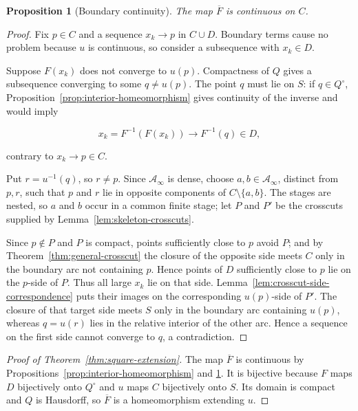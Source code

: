 \documentclass[11pt]{article}
\theoremstyle{mainplain}
\newtheorem{proposition}[theorem]{Proposition}
\theoremstyle{mainroman}
\theoremstyle{definition}
\numberwithin{equation}{section}
\begin{document}
\begin{proposition}[Boundary continuity]\label{prop:boundary-continuity}
The map \(\overline F\) is continuous on \(C\).
\end{proposition}
\begin{proof}
Fix \(p\in C\) and a sequence \(x_k\to p\) in \(C\cup D\). Boundary terms cause no problem because \(u\) is continuous, so consider a subsequence with \(x_k\in D\).

Suppose \(F(x_k)\) does not converge to \(u(p)\). Compactness of \(Q\) gives a subsequence converging to some \(q\ne u(p)\). The point \(q\) must lie on \(S\): if \(q\in Q^\circ\),
Proposition~\ref{prop:interior-homeomorphism} gives continuity of the inverse and
would imply

\[
x_k=F^{-1}(F(x_k))\longrightarrow F^{-1}(q)\in D,
\]

contrary to \(x_k\to p\in C\).

Put \(r=u^{-1}(q)\), so \(r\ne p\). Since \(\mathcal A_\infty\) is dense, choose \(a,b\in\mathcal A_\infty\), distinct from \(p,r\), such that \(p\) and \(r\) lie in opposite components of \(C\setminus\{a,b\}\). The stages are nested, so \(a\) and \(b\) occur in a common finite stage; let \(P\) and \(P'\) be the crosscuts supplied by Lemma~\ref{lem:skeleton-crosscuts}.

Since \(p\notin P\) and \(P\) is compact, points sufficiently close to \(p\) avoid \(P\); and by Theorem~\ref{thm:general-crosscut} the closure of the opposite side meets \(C\) only in the boundary arc not containing \(p\). Hence points of \(D\) sufficiently close to \(p\) lie on the \(p\)-side of \(P\). Thus all large \(x_k\) lie on that side. Lemma~\ref{lem:crosscut-side-correspondence} puts their images on the corresponding \(u(p)\)-side of \(P'\). The closure of that target side meets \(S\) only in the boundary arc containing \(u(p)\), whereas \(q=u(r)\) lies in the relative interior of the other arc. Hence a sequence on the first side cannot converge to \(q\), a contradiction. \end{proof}

\begin{proof}[Proof of Theorem~\ref{thm:square-extension}]
The map $\overline F$ is continuous by
Propositions~\ref{prop:interior-homeomorphism} and \ref{prop:boundary-continuity}. It is
bijective because $F$ maps $D$ bijectively onto $Q^\circ$ and $u$ maps
$C$ bijectively onto $S$. Its domain is compact and $Q$ is Hausdorff,
so $\overline F$ is a homeomorphism extending $u$.
\end{proof}
\end{document}
